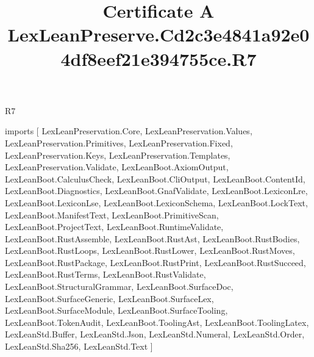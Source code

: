 \begin{lexlean}{R7}
\title{Certificate A LexLeanPreserve.Cd2c3e4841a92e04df8eef21e394755ce.R7}
\begin{coremodule}
imports [
  LexLeanPreservation.Core,
  LexLeanPreservation.Values,
  LexLeanPreservation.Primitives,
  LexLeanPreservation.Fixed,
  LexLeanPreservation.Keys,
  LexLeanPreservation.Templates,
  LexLeanPreservation.Validate,
  LexLeanBoot.AxiomOutput,
  LexLeanBoot.CalculusCheck,
  LexLeanBoot.CliOutput,
  LexLeanBoot.ContentId,
  LexLeanBoot.Diagnostics,
  LexLeanBoot.GnafValidate,
  LexLeanBoot.LexiconLre,
  LexLeanBoot.LexiconLse,
  LexLeanBoot.LexiconSchema,
  LexLeanBoot.LockText,
  LexLeanBoot.ManifestText,
  LexLeanBoot.PrimitiveScan,
  LexLeanBoot.ProjectText,
  LexLeanBoot.RuntimeValidate,
  LexLeanBoot.RustAssemble,
  LexLeanBoot.RustAst,
  LexLeanBoot.RustBodies,
  LexLeanBoot.RustLoops,
  LexLeanBoot.RustLower,
  LexLeanBoot.RustMoves,
  LexLeanBoot.RustPackage,
  LexLeanBoot.RustPrint,
  LexLeanBoot.RustSucceed,
  LexLeanBoot.RustTerms,
  LexLeanBoot.RustValidate,
  LexLeanBoot.StructuralGrammar,
  LexLeanBoot.SurfaceDoc,
  LexLeanBoot.SurfaceGeneric,
  LexLeanBoot.SurfaceLex,
  LexLeanBoot.SurfaceModule,
  LexLeanBoot.SurfaceTooling,
  LexLeanBoot.TokenAudit,
  LexLeanBoot.ToolingAst,
  LexLeanBoot.ToolingLatex,
  LexLeanStd.Buffer,
  LexLeanStd.Json,
  LexLeanStd.Numeral,
  LexLeanStd.Order,
  LexLeanStd.Sha256,
  LexLeanStd.Text
]


\end{coremodule}
\end{lexlean}
